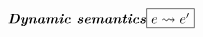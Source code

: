 \documentclass{article}
\def\emphbf#1{\textbf{\emph{#1}}}
\newcommand{\judgementHead}[2]{\ensuremath{\emphbf{#1}\hfill\fbox{#2}}}
\newcommand{\teval}[4]{\ensuremath{#1 \vdash #2:#3\ \&\ #4}}
\newcommand{\eeval}[2]{\ensuremath{#1 \rightsquigarrow #2}}
\newcommand{\subst}[2]{\ensuremath{[ #1 \mapsto #2 ]}}
\newcommand{\targ}{\texttt{targ}}
\newcommand{\trec}{\texttt{trec}}
\newcommand\trspace{\vspace{0.8em}}
\newcommand\expr{\ensuremath{e}\xspace}
\newcommand\type{\tau}
\newcommand\eself{\texttt{self}\xspace}
\newcommand\emethcall[3]{\ensuremath{#1.#2(#3)}\xspace}
\newcommand\mthtype[2]{\ensuremath{#1 \rightarrow #2}\xspace}
\begin{document}
\begin{figure}
\begin{comment}
\inference{\teval{\Gamma}{\expr_0}{\Gamma_1}{A} &&
\teval{\Gamma_1}{\expr_1}{\Gamma_2}{\basetype} \\
\Gamma_1(A.m) = \mthtype{\expr_{t1}}{\type_2} \\
\eeval{\expr_{t1}\subst{\trec}{A}\subst{\targ}{\basetype}\subst{\eself}{A}}{\basetype_1} \\
\teval{\Gamma_2\subst{A.m}{(\mthtype{\basetype_1}{\type_2})}}{\emethcall{\expr_0}{m}{\expr_1}}{\Gamma_3}{\basetype_2} \\
\textnormal{no effects in $e_{t1}$}
}
{\teval{\Gamma}{\emethcall{\expr_0}{m}{\expr_1}}{\Gamma_3}{\basetype_2}}[TAppArg]
$$
\trspace
$$
\inference{\teval{\Gamma}{\expr_0}{\Gamma_1}{A} &&
\teval{\Gamma_1}{\expr_1}{\Gamma_2}{\basetype} \\
\Gamma_1(A.m) = \mthtype{\basetype_1}{\expr_{t2}} \\
\basetype\leq\basetype_1 \\
\eeval{\expr_{t2}\subst{\trec}{A}\subst{\targ}{\basetype}\subst{\eself}{A}}{\basetype_2} \\
\textnormal{no effects in $e_{t2}$}
}
{\teval{\Gamma}{\emethcall{\expr_0}{m}{\expr_1}}{\Gamma_2}{\basetype_2}}[TAppRet]
\end{comment}
\end{figure}

\begin{figure}
\centering
\judgementHead{Dynamic semantics}{\eeval{\expr}{\expr'}}
\end{figure}
\end{document}
